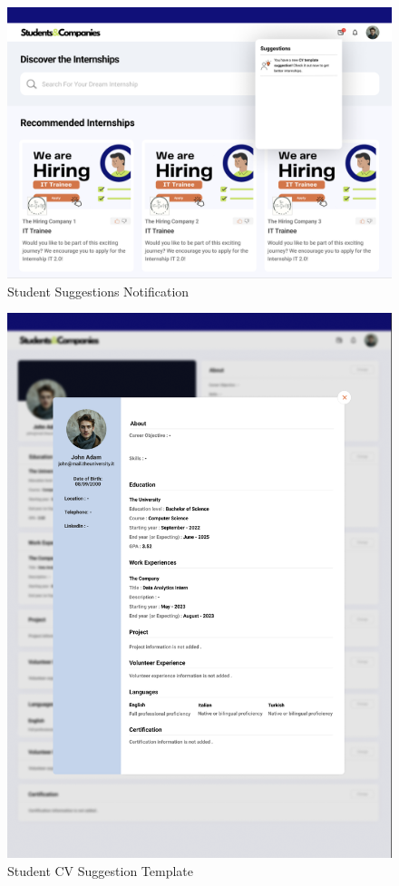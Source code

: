 \documentclass[a4paper,12pt]{article}
\begin{document}
\begin{figure}[H]
    \centering
    \includegraphics[scale = 0.42]{figures/UserInterfaces/Student/SuggestionNotification.png}
    \caption{Student Suggestions Notification}
     \centering
\end{figure}
\begin{figure}[H]
    \centering
    \includegraphics[scale = 0.65]{figures/UserInterfaces/Student/CVSuggestion.png}
    \caption{Student CV Suggestion Template}
     \centering
\end{figure}
\end{document}
